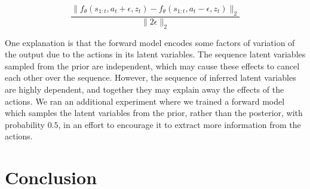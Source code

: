 \documentclass{article} %
\begin{document}
\begin{equation}
\frac{\| f_\theta(s_{1:t}, a_t + \epsilon, z_t) - f_\theta(s_{1:t}, a_t - \epsilon, z_t) \|_2}{\| 2\epsilon \|_2}
\end{equation}

One explanation is that the forward model encodes some factors of variation of the output due to the actions in its latent variables.
The sequence latent variables sampled from the prior are independent, which may cause these effects to cancel each other over the sequence. However, the sequence of inferred latent variables are highly dependent, and together they may explain away the effects of the actions. We ran an additional experiment where we trained a forward model which samples the latent variables from the prior, rather than the posterior, with probability $0.5$, in an effort to encourage it to extract more information from the actions.




  \section{Conclusion}
\end{document}
